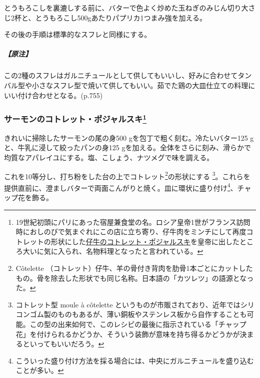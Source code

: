 

とうもろこしを裏漉しする前に、バターで色よく炒めた玉ねぎのみじん切り大さじ2杯と、とうもろこし500gあたりパプリカ1つまみ強を加える。

その後の手順は標準的なスフレと同様にする。

\hypertarget{ux539fux6ce8-1}{%
\subparagraph{【原注】}\label{ux539fux6ce8-1}}

この2種のスフレはガルニチュールとして供してもいいし、好みに合わせてタンバル型や小さなスフレ型で焼いて供してもいい。茹でた鶏の大皿仕立ての料理にいい付け合わせとなる。(p.755)

\hypertarget{cotelettes-de-saumon-pojarski}{%
\subsubsection[サーモンのコトレット・ポジャルスキ]{\texorpdfstring{サーモンのコトレット・ポジャルスキ\footnote{19世紀初頭にパリにあった宿屋兼食堂の名。ロシア皇帝1世がフランス訪問時におしのびで気まぐれにこの店に立ち寄り、仔牛肉をミンチにして再度コトレットの形状にした\protect\hyperlink{cote-de-veau-pojarski}{仔牛のコトレット・ポジャルスキ}を皇帝に出したところ大いに気に入られ、名物料理となったと言われている。}}{サーモンのコトレット・ポジャルスキ}}\label{cotelettes-de-saumon-pojarski}}


きれいに掃除したサーモンの尾の身500 gを包丁で粗く刻む。冷たいバター125
gと、牛乳に浸して絞ったパンの身125
gを加える。全体をさらに刻み、滑らかで均質なアパレイユにする。塩、こしょう、ナツメグで味を調える。

これを10等分し、打ち粉をした台の上でコトレット\footnote{Côtelette
  （コトレット）仔牛、羊の骨付き背肉を肋骨1本ごとにカットしたもの。骨を除去した形状でも同じ名称。日本語の「カツレツ」の語源となった。}の形状にする
\footnote{コトレット型 moule à côtelette
  というものが市販されており、近年ではシリコンゴム製のものもあるが、薄い銅板やステンレス板から自作することも可能。この型の出来如何で、このレシピの最後に指示されている「チャップ花」を付けられるかどうか、そういう装飾が意味を持ち得るかどうかが決まるといってもいいだろう。}。これらを提供直前に、澄ましバターで両面こんがりと焼く。皿に環状に盛り付け\footnote{こういった盛り付け方法を採る場合には、中央にガルニチュールを盛り込むことが多い。}、チャップ花を飾る。


